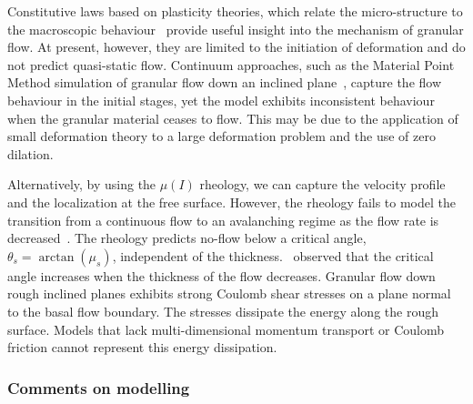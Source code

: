 Constitutive laws based on plasticity theories, which relate the 
micro-structure to the macroscopic behaviour~\citep{Roux2002} provide 
useful insight into the mechanism of granular flow. At present, however, they 
are limited to the initiation of deformation and do not predict quasi-static 
flow. Continuum approaches, such as the Material Point Method simulation of 
granular flow down 
an inclined plane~\citep{Abe2006,Bandara2013}, capture the flow behaviour in 
the initial stages, yet the model exhibits inconsistent behaviour when the 
granular material ceases to flow. This may be due to the application of small 
deformation theory to a large deformation problem and the use of zero dilation. 

Alternatively, by using the $\mu(\textit{I})$ rheology, we can capture the 
velocity profile and the localization at the free surface. However, the 
rheology fails to 
model the transition from a continuous flow to an avalanching regime as the 
flow rate is decreased~\citep{Pouliquen2006}. The rheology predicts no-flow 
below a critical angle, $\theta_s = \arctan(\mu_s)$, independent of the 
thickness.~\citet{Pouliquen1999} observed that the critical angle increases 
when the thickness of the flow decreases. Granular 
flow down rough inclined planes exhibits strong Coulomb shear stresses on a 
plane normal to the basal flow boundary. The stresses dissipate the energy 
along the rough surface. Models that lack multi-dimensional momentum transport 
or Coulomb friction cannot represent this energy dissipation.

\subsubsection{Comments on modelling}

